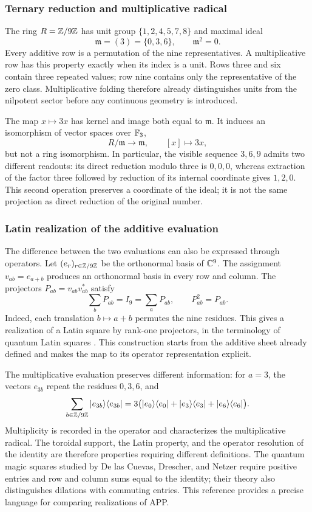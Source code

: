 \subsubsection{Ternary reduction and multiplicative radical}

The ring \(R=\mathbb Z/9\mathbb Z\) has unit group \(\{1,2,4,5,7,8\}\) and maximal ideal
\[
 \mathfrak m=(3)=\{0,3,6\},\qquad\mathfrak m^2=0.
\]
Every additive row is a permutation of the nine representatives. A multiplicative row has this property exactly when its index is a unit. Rows three and six contain three repeated values; row nine contains only the representative of the zero class. Multiplicative folding therefore already distinguishes units from the nilpotent sector before any continuous geometry is introduced.

The map \(x\mapsto3x\) has kernel and image both equal to \(\mathfrak m\). It induces an isomorphism of vector spaces over \(\mathbb F_3\),
\[
 R/\mathfrak m\longrightarrow\mathfrak m,\qquad [x]\longmapsto3x,
\]
but not a ring isomorphism. In particular, the visible sequence \(3,6,9\) admits two different readouts: its direct reduction modulo three is \(0,0,0\), whereas extraction of the factor three followed by reduction of its internal coordinate gives \(1,2,0\). This second operation preserves a coordinate of the ideal; it is not the same projection as direct reduction of the original number.

\subsubsection{Latin realization of the additive evaluation}

The difference between the two evaluations can also be expressed through
operators. Let \((e_r)_{r\in\mathbb Z/9\mathbb Z}\) be the orthonormal basis of \(\mathbb C^9\).
The assignment \(v_{ab}=e_{a+b}\) produces an orthonormal basis in every row
and column. The projectors \(P_{ab}=v_{ab}v_{ab}^{*}\) satisfy
\[
 \sum_bP_{ab}=I_9=\sum_aP_{ab},\qquad P_{ab}^2=P_{ab}.
\]
Indeed, each translation \(b\mapsto a+b\) permutes the nine residues.
This gives a realization of a Latin square by rank-one projectors,
in the terminology of quantum Latin squares
\cite{mustovicary,delascuevas2023}. This construction starts from the
additive sheet already defined and makes the map to its operator representation explicit.

The multiplicative evaluation preserves different information: for \(a=3\), the
vectors \(e_{3b}\) repeat the residues \(0,3,6\), and
\[
 \sum_{b\in\mathbb Z/9\mathbb Z}|e_{3b}\rangle\langle e_{3b}|
 =3\bigl(|e_0\rangle\langle e_0|+|e_3\rangle\langle e_3|
                    +|e_6\rangle\langle e_6|\bigr).
\]
Multiplicity is recorded in the operator and characterizes the
multiplicative radical. The toroidal support, the Latin property, and the
operator resolution of the identity are therefore properties requiring
different definitions. The quantum magic squares studied by
De las Cuevas, Drescher, and Netzer require positive entries and row and
column sums equal to the identity; their theory also distinguishes
dilations with commuting entries\cite{delascuevas2020}. This reference
provides a precise language for comparing realizations of APP.

